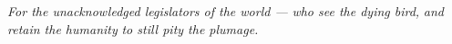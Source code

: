 \emph{For the unacknowledged legislators of the world ---} \emph{who see
the dying bird,} \emph{and retain the humanity} \emph{to still pity the
plumage.}
